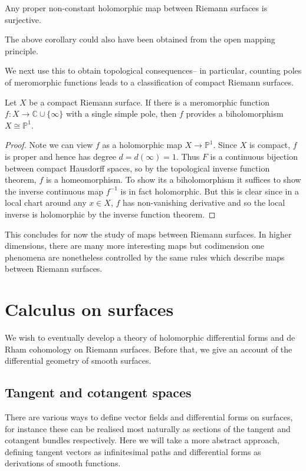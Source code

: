 \begin{corollary}
    Any proper non-constant holomorphic map between Riemann surfaces is
    surjective.
\end{corollary}

\begin{remark}
    The above corollary could also have been obtained from the open mapping
    principle.
\end{remark}

We next use this to obtain topological consequences-- in particular, counting
poles of meromorphic functions leads to a classification of compact Riemann
surfaces.

\begin{corollary}
    Let \(X\) be a compact Riemann surface. If there is a meromorphic function
    \(f:X\to \mathbb{C}\cup \{\infty\}\) with a single simple pole, then \(f\)
    provides a biholomorphism \(X\cong \mathbb{P}^1\).

    \begin{proof}
        Note we can view \(f\) as a holomorphic map \(X\to \mathbb{P}^1\). Since
        \(X\) is compact, \(f\) is proper and hence has degree
        \(d=d(\infty)=1\). Thus \(F\) is a continuous bijection between compact
        Hausdorff spaces, so by the topological inverse function theorem, \(f\)
        is a homeomorphism. To show its a biholomorphism it suffices to show the
        inverse continuous map \(f^{-1}\) is in fact holomorphic. But this is
        clear since in a local chart around any \(x\in X\), \(f\) has
        non-vanishing derivative and so the local inverse is holomorphic by the
        inverse function theorem.
    \end{proof}
\end{corollary}

This concludes for now the study of maps between Riemann surfaces. In higher
dimensions, there are many more interesting maps but codimension one phenomena
are nonetheless controlled by the same rules which describe maps between Riemann
surfaces.

\section{Calculus on surfaces}
We wish to eventually develop a theory of holomorphic differential forms and de
Rham cohomology on Riemann surfaces. Before that, we give an account of the
differential geometry of smooth surfaces.

\subsection{Tangent and cotangent spaces}
There are various ways to define vector fields and differential forms on
surfaces, for instance these can be realised most naturally as sections of the
tangent and cotangent bundles respectively. Here we will take a more
abstract approach, defining tangent vectors as infinitesimal paths and
differential forms as derivations of smooth functions.

